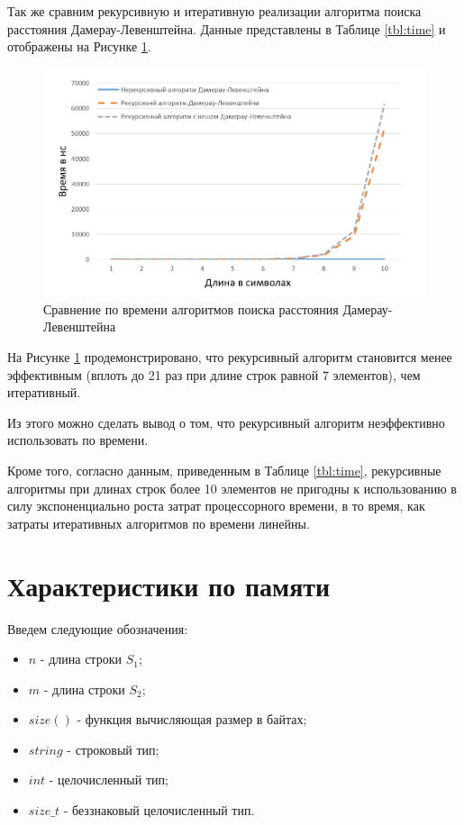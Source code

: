 Так же сравним рекурсивную и итеративную реализации алгоритма поиска расстояния Дамерау-Левенштейна. Данные представлены в Таблице \ref{tbl:time} и отображены на Рисунке \ref{plt:time_02}.

\begin{figure}[h]
	\centering
	\includegraphics[height=0.3\textheight]{img/diag_02.png}
	\caption{Сравнение по времени алгоритмов поиска расстояния Дамерау-Левенштейна}
	\label{plt:time_02}
\end{figure}

На Рисунке \ref{plt:time_02} продемонстрировано, что рекурсивный алгоритм становится менее эффективным (вплоть до 21 раз при длине строк равной 7 элементов), чем итеративный.

Из этого можно сделать вывод о том, что рекурсивный алгоритм неэффективно использовать по времени.

Кроме того, согласно данным, приведенным в Таблице \ref{tbl:time}, рекурсивные алгоритмы при длинах строк более 10 элементов не пригодны к использованию в силу экспоненциально роста затрат процессорного времени, в то время, как затраты итеративных алгоритмов по времени линейны.

\section{Характеристики по памяти}

Введем следующие обозначения:
\begin{itemize}
	\item$n$ - длина строки $S_{1}$;
	\item$m$ - длина строки $S_{2}$;
	\item$size()$ - функция вычисляющая размер в байтах;
	\item $string$ - строковый тип;
	\item $int$ - целочисленный тип;
	\item $size\_t$ - беззнаковый целочисленный тип.
\end{itemize}

